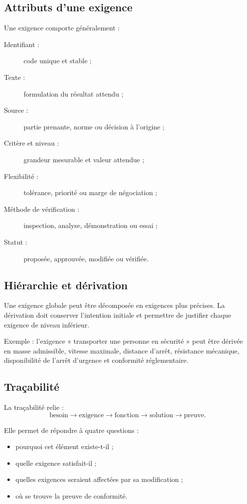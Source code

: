 \subsection{Attributs d'une exigence}

Une exigence comporte généralement :
\begin{description}
  \item[Identifiant :] code unique et stable ;
  \item[Texte :] formulation du résultat attendu ;
  \item[Source :] partie prenante, norme ou décision à l'origine ;
  \item[Critère et niveau :] grandeur mesurable et valeur attendue ;
  \item[Flexibilité :] tolérance, priorité ou marge de négociation ;
  \item[Méthode de vérification :] inspection, analyse, démonstration ou essai ;
  \item[Statut :] proposée, approuvée, modifiée ou vérifiée.
\end{description}

\ISDiagrammeExigences

\subsection{Hiérarchie et dérivation}

Une exigence globale peut être décomposée en exigences plus précises. La dérivation doit conserver l'intention initiale et permettre de justifier chaque exigence de niveau inférieur.

Exemple : l'exigence « transporter une personne en sécurité » peut être dérivée en masse admissible, vitesse maximale, distance d'arrêt, résistance mécanique, disponibilité de l'arrêt d'urgence et conformité réglementaire.

\subsection{Traçabilité}

La traçabilité relie :
\[
\text{besoin}\longrightarrow\text{exigence}\longrightarrow\text{fonction}
\longrightarrow\text{solution}\longrightarrow\text{preuve}.
\]

Elle permet de répondre à quatre questions :
\begin{itemize}
  \item pourquoi cet élément existe-t-il ;
  \item quelle exigence satisfait-il ;
  \item quelles exigences seraient affectées par sa modification ;
  \item où se trouve la preuve de conformité.
\end{itemize}

